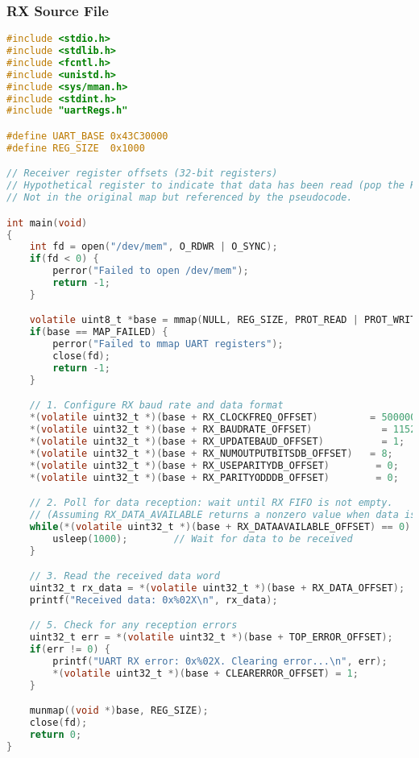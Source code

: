 \subsubsection{RX Source File}
\begin{lstlisting}[language=C,frame=single,label={lst:rx-source}]
#include <stdio.h>
#include <stdlib.h>
#include <fcntl.h>
#include <unistd.h>
#include <sys/mman.h>
#include <stdint.h>
#include "uartRegs.h"

#define UART_BASE 0x43C30000
#define REG_SIZE  0x1000

// Receiver register offsets (32-bit registers)
// Hypothetical register to indicate that data has been read (pop the RX FIFO)
// Not in the original map but referenced by the pseudocode.

int main(void)
{
    int fd = open("/dev/mem", O_RDWR | O_SYNC);
    if(fd < 0) {
        perror("Failed to open /dev/mem");
        return -1;
    }

    volatile uint8_t *base = mmap(NULL, REG_SIZE, PROT_READ | PROT_WRITE, MAP_SHARED, fd, UART_BASE);
    if(base == MAP_FAILED) {
        perror("Failed to mmap UART registers");
        close(fd);
        return -1;
    }

    // 1. Configure RX baud rate and data format
    *(volatile uint32_t *)(base + RX_CLOCKFREQ_OFFSET)         = 50000000;  // Set RX system clock frequency to 25 MHz
    *(volatile uint32_t *)(base + RX_BAUDRATE_OFFSET)            = 115200;    // Set desired baud rate to 115200
    *(volatile uint32_t *)(base + RX_UPDATEBAUD_OFFSET)          = 1;         // Trigger RX baud rate update
    *(volatile uint32_t *)(base + RX_NUMOUTPUTBITSDB_OFFSET)   = 8;         // Configure for 8 data bits per frame
    *(volatile uint32_t *)(base + RX_USEPARITYDB_OFFSET)        = 0;         // Disable parity
    *(volatile uint32_t *)(base + RX_PARITYODDDB_OFFSET)        = 0;         // (Ignored if parity is disabled)

    // 2. Poll for data reception: wait until RX FIFO is not empty.
    // (Assuming RX_DATA_AVAILABLE returns a nonzero value when data is available.)
    while(*(volatile uint32_t *)(base + RX_DATAAVAILABLE_OFFSET) == 0) {
        usleep(1000);        // Wait for data to be received
    }

    // 3. Read the received data word
    uint32_t rx_data = *(volatile uint32_t *)(base + RX_DATA_OFFSET);
    printf("Received data: 0x%02X\n", rx_data);

    // 5. Check for any reception errors
    uint32_t err = *(volatile uint32_t *)(base + TOP_ERROR_OFFSET);
    if(err != 0) {
        printf("UART RX error: 0x%02X. Clearing error...\n", err);
        *(volatile uint32_t *)(base + CLEARERROR_OFFSET) = 1;
    }

    munmap((void *)base, REG_SIZE);
    close(fd);
    return 0;
}
\end{lstlisting}

